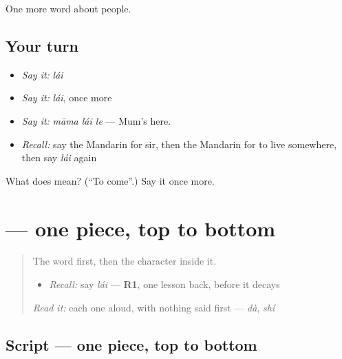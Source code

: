 \begin{grammarlens}[title={What you've built}]
One more word about people.
\end{grammarlens}

\subsection*{Your turn}
\begin{itemize}
\raggedright
  \item \emph{Say it:} \emph{lái}
  \item \emph{Say it:} \emph{lái}, once more
  \item \emph{Say it:} \emph{māma lái le} — Mum's here.
  \item \emph{Recall:} say the Mandarin for sir, then the Mandarin for to live somewhere, then say \emph{lái} again
\end{itemize}

\begin{tcolorbox}[breakable,colback=teal!4,colframe=teal!35!black,title={Before you move on}]
What does  mean? (\textquotedblleft{}To come\textquotedblright{}.) Say it once more.
\end{tcolorbox}
\section[\texorpdfstring{\zh{来} (lái)}{来 (lái)}]{ — one piece, top to bottom}

\label{lesson:ZH-W36-lai}



\begin{quote}
The word first, then the character inside it.

\begin{itemize}
\raggedright
  \item \emph{Recall:} say \emph{lái} — \textbf{R1}, one lesson back, before it decays
\end{itemize}

\begin{quote}
 
\end{quote}

\emph{Read it:} each one aloud, with nothing said first — \emph{dà}, \emph{shí}
\end{quote}

\subsection*{Script — one piece, top to bottom}

